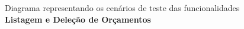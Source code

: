             \begin{figure}[!htb]
                \centering
	            \begin{minipage}{\wd0}
		            \caption{Diagrama representando os cenários de teste das funcionalidades \textbf{Listagem e Deleção de Orçamentos}}
		            \label{fig:testing-mind-map-orcamentos-listagem-e-delecao}
	            \end{minipage}
            \end{figure}

